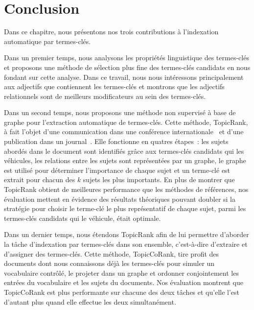 
  \section{Conclusion}
  \label{sec:main-automatic_keyphrase_annotation-conclusion}
    Dans ce chapitre, nous présentons nos trois contributions à l'indexation
    automatique par termes-clés.
    
    Dans un premier temps, nous analysons les propriétés linguistique des
    termes-clés et proposons une méthode de sélection plus fine des termes-clés
    candidats en nous fondant sur cette analyse. Dans ce travail, nous nous
    intéressons principalement aux adjectifs que contiennent les termes-clés et
    montrons que les adjectifs relationnels sont de meilleurs modificateurs au
    sein des termes-clés.
    
    Dans un second temps, nous proposons une méthode non supervisé à base de
    graphe pour l'extraction automatique de termes-clés. Cette méthode,
    TopicRank, à fait l'objet d'une communication dans une conférence
    internationale~\cite{bougouin2013topicrank} et d'une publication dans un
    journal~\cite{bougouin2014topicrank}. Elle fonctionne en quatres étapes~:
    les sujets abordés dans le document sont identifiés grâce aux termes-clés
    candidats qui les véhicules, les relations entre les sujets sont
    représentées par un graphe, le graphe est utilisé pour déterminer
    l'importance de chaque sujet et un terme-clé est extrait pour chacun des $k$
    sujets les plus importants. En plus de montrer que TopicRank obtient de
    meilleures performance que les méthodes de références, nos évaluation
    mettent en évidence des résultats théoriques pouvant doubler si la stratégie
    pour choisir le terme-clé le plus représentatif de chaque sujet, parmi les
    termes-clés candidats qui le véhicule, était optimale.

    Dans un dernier temps, nous étendons TopicRank afin de lui permettre
    d'aborder la tâche d'indexation par termes-clés dans son ensemble,
    c'est-à-dire d'extraire et d'assigner des termes-clés. Cette méthode,
    TopicCoRank, tire profit des documents dont nous connaissons déjà les
    termes-clés pour simuler un vocabulaire contrôlé, le projeter dans un graphe
    et ordonner conjointement les entrées du vocabulaire et les sujets du
    documents. Nos évaluation montrent que TopicCoRank est plus performante
    sur chacune des deux tâches et qu'elle l'est d'autant plus quand elle
    effectue les deux simultanément.
    
